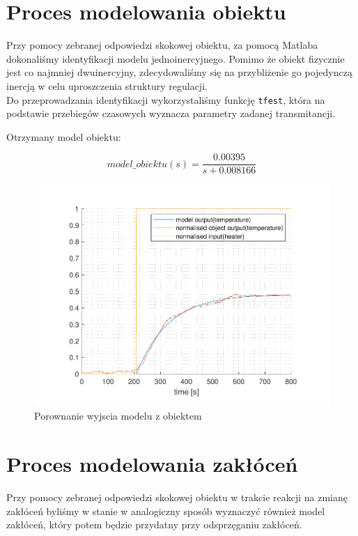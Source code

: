 \documentclass{mwrep}
\begin{document}
\section{Proces modelowania obiektu}
\label{ModelowanieObiektu}
Przy pomocy zebranej odpowiedzi skokowej obiektu, za pomocą Matlaba dokonaliśmy identyfikacji 
modelu jednoinercyjnego. Pomimo że obiekt fizycznie jest co najmniej dwuinercyjny, zdecydowaliśmy się na 
przybliżenie go pojedynczą inercją w celu uproszczenia struktury regulacji. \\
\indent Do przeprowadzania identyfikacji wykorzystaliśmy funkcję \texttt{tfest}, która na podstawie 
przebiegów czasowych wyznacza parametry zadanej transmitancji. 

Otrzymany model obiektu:

\[model\_obiektu(s) = \frac{0.00395}{s + 0.008166}\]

\begin{figure}[H]
\centering
\includegraphics[scale=0.8]{materialy/krystian_plots/wykresik_model_obiekt.pdf}
\caption{Porownanie wyjscia modelu z obiektem}
\end{figure}

\section{Proces modelowania zakłóceń}
\label{ModelowanieZaklocen}
Przy pomocy zebranej odpowiedzi skokowej obiektu w trakcie reakcji na zmianę zakłóceń byliśmy w stanie w analogiczny sposób wyznaczyć również model zakłóceń, który potem będzie przydatny przy odsprzęganiu zakłóceń.
\end{document}
